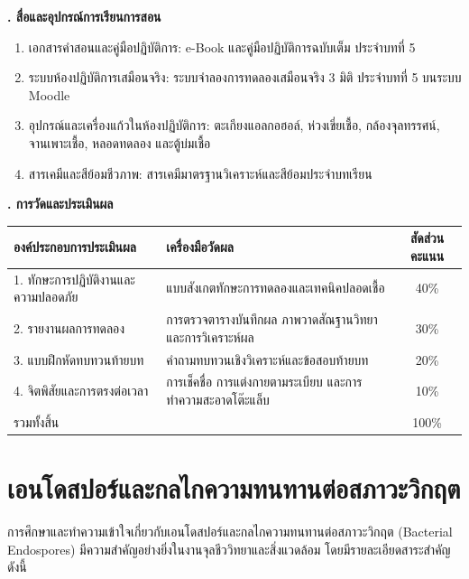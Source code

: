 \noindent\textbf{. สื่อและอุปกรณ์การเรียนการสอน}

\begin{enumerate}
    \item เอกสารคำสอนและคู่มือปฏิบัติการ: e-Book และคู่มือปฏิบัติการฉบับเต็ม ประจำบทที่ 5
    \item ระบบห้องปฏิบัติการเสมือนจริง: ระบบจำลองการทดลองเสมือนจริง 3 มิติ ประจำบทที่ 5 บนระบบ Moodle
    \item อุปกรณ์และเครื่องแก้วในห้องปฏิบัติการ: ตะเกียงแอลกอฮอล์, ห่วงเขี่ยเชื้อ, กล้องจุลทรรศน์, จานเพาะเชื้อ, หลอดทดลอง และตู้บ่มเชื้อ
    \item สารเคมีและสีย้อมชีวภาพ: สารเคมีมาตรฐานวิเคราะห์และสีย้อมประจำบทเรียน
\end{enumerate}

\noindent\textbf{. การวัดและประเมินผล}

\begin{table}[H]
\centering\small
\begin{tabularx}{\textwidth}{p{} p{} c}
\toprule
\textbf{องค์ประกอบการประเมินผล} & \textbf{เครื่องมือวัดผล} & \textbf{สัดส่วนคะแนน} \\
\midrule
1. ทักษะการปฏิบัติงานและความปลอดภัย & แบบสังเกตทักษะการทดลองและเทคนิคปลอดเชื้อ & 40\% \\
2. รายงานผลการทดลอง & การตรวจตารางบันทึกผล ภาพวาดสัณฐานวิทยา และการวิเคราะห์ผล & 30\% \\
3. แบบฝึกหัดทบทวนท้ายบท & คำถามทบทวนเชิงวิเคราะห์และข้อสอบท้ายบท & 20\% \\
4. จิตพิสัยและการตรงต่อเวลา & การเช็คชื่อ การแต่งกายตามระเบียบ และการทำความสะอาดโต๊ะแล็บ & 10\% \\
รวมทั้งสิ้น &  & 100\% \\
\bottomrule
\end{tabularx}
\end{table}

\newpage


\section{เอนโดสปอร์และกลไกความทนทานต่อสภาวะวิกฤต}

การศึกษาและทำความเข้าใจเกี่ยวกับเอนโดสปอร์และกลไกความทนทานต่อสภาวะวิกฤต (Bacterial Endospores) มีความสำคัญอย่างยิ่งในงานจุลชีววิทยาและสิ่งแวดล้อม โดยมีรายละเอียดสาระสำคัญดังนี้


